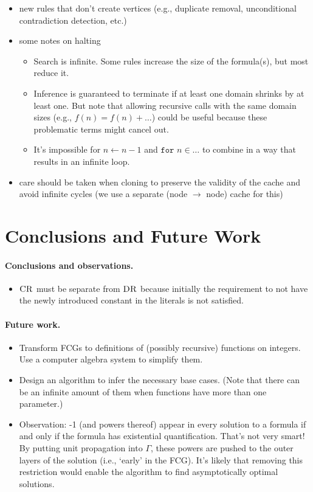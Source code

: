 \documentclass{article}
\theoremstyle{definition}
\theoremstyle{remark}
\DeclareMathOperator{\CR}{\textsc{CR}}
\DeclareMathOperator{\DR}{\textsc{DR}}
\begin{document}
\begin{itemize}
\item new rules that don't create vertices (e.g., duplicate removal, unconditional contradiction detection, etc.)
\item some notes on halting
  \begin{itemize}
  \item Search is infinite. Some rules increase the size of the formula(s), but most reduce it.
  \item Inference is guaranteed to terminate if at least one domain shrinks by at least one. But note that allowing recursive calls with the same domain sizes (e.g., $f(n) = f(n) + \dots$) could be useful because these problematic terms might cancel out.
  \item It's impossible for $n \gets n - 1$ and $\texttt{for } n \in \dots$ to combine in a way that results in an infinite loop.
  \end{itemize}
\item care should be taken when cloning to preserve the validity of the cache and avoid infinite cycles (we use a separate (node $\to$ node) cache for this)
\end{itemize}

\section{Conclusions and Future Work}

\paragraph{Conclusions and observations.}
\begin{itemize}
\item $\CR$ must be separate from $\DR$ because initially the requirement to not have the newly introduced constant in the literals is not satisfied.
\end{itemize}

\paragraph{Future work.}
\begin{itemize}
\item Transform FCGs to definitions of (possibly recursive) functions on integers. Use a computer algebra system to simplify them.
\item Design an algorithm to infer the necessary base cases. (Note that there can be an infinite amount of them when functions have more than one parameter.)
\item Observation: -1 (and powers thereof) appear in every solution to a formula if and only if the formula has existential quantification. That's not very smart! By putting unit propagation into $\Gamma$, these powers are pushed to the outer layers of the solution (i.e., `early' in the FCG). It's likely that removing this restriction would enable the algorithm to find asymptotically optimal solutions.
\end{itemize}



\end{document}
